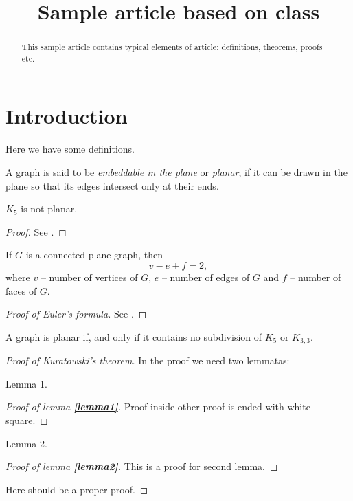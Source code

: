 \documentclass{dmgt}
\title{Sample article based on \texttt{\journalacronym{}} class}
\begin{document}
\begin{abstract}
This sample article contains typical elements of article: definitions, theorems, proofs etc. 
\end{abstract}

\section{Introduction}

Here we have some definitions.

\begin{dnt}
A graph is said to be \emph{embeddable in the plane} or \emph{planar}, if it can be drawn in the plane
so that its edges intersect only at their ends.
\end{dnt}


\begin{theorem}
$K_5$ is not planar.
\end{theorem}

\begin{proof}
See \cite{gtwa}.

\end{proof}

\begin{theorem}
If $G$ is a connected plane graph, then 
$$v-e+f=2,$$
where $v$ -- number of vertices of $G$, $e$ -- number of edges of $G$ and $f$ -- number of faces of $G$.
\end{theorem}

\begin{proof}[Proof of Euler's formula]
See \cite{gtwa}.

\end{proof}

\begin{theorem}[(Kuratowski)]
A graph is planar if, and only if it contains no subdivision of $K_5$ or $K_{3,3}$.
\end{theorem}

\begin{proof}[Proof of Kuratowski's theorem]
In the proof we need two lemmatas:

\begin{lemma}\label{lemma1}
Lemma 1.
\end{lemma}

\begin{proof}[Proof of lemma {\bf \ref{lemma1}}]
Proof inside other proof is ended with white square.

\end{proof}


\begin{lemma}\label{lemma2}
Lemma 2.

\end{lemma}

\begin{proof}[Proof of lemma {\bf \ref{lemma2}}]
This is a proof for second lemma.

\end{proof}

Here should be a proper proof.

\end{proof}
\end{document}
